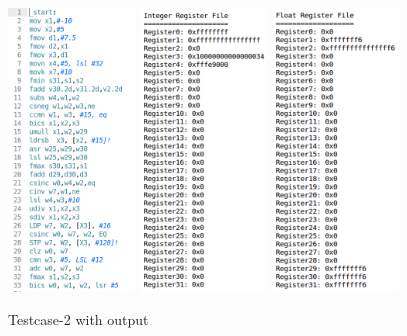 \documentclass[12pt]{report}
\begin{document}
\begin{figure}[!htb]
\caption{Testcase-2 with output}
\centering
\includegraphics[width=0.30\textwidth]{bench2.png}
\includegraphics[width=0.30\textwidth]{bench2_intRF.png}
\includegraphics[width=0.30\textwidth]{bench2_floatRF.png}
\end{figure}
\end{document}
